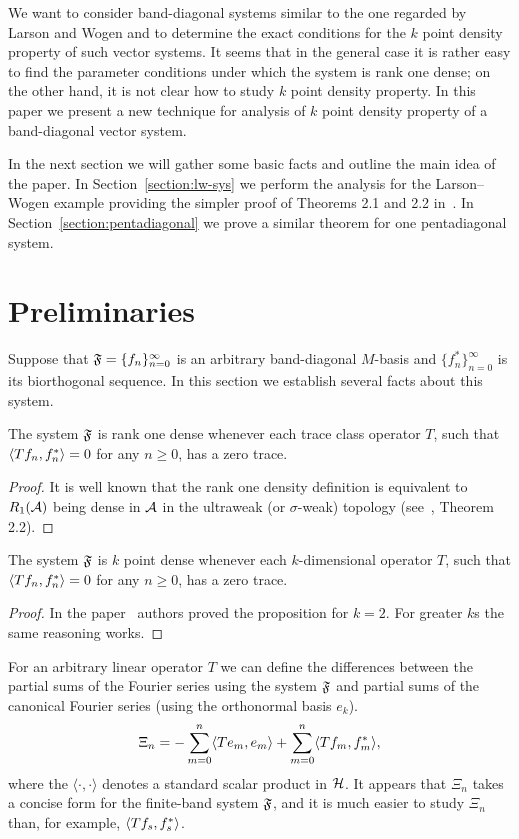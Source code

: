\documentclass[12pt]{amsart}
\theoremstyle{case}
\begin{document}
    We want to consider band-diagonal systems similar to the one regarded by Larson and Wogen and to determine the exact conditions
      for the $k$ point density property of such vector systems.
    It seems that in the general case it is rather easy to find the parameter conditions under which the system is rank one dense;
      on the other hand, it is not clear how to study $k$ point density property.
    In this paper we present a new technique for analysis of $k$ point density property of a band-diagonal vector system.

    In the next section we will gather some basic facts and outline the main idea of the paper.
    In Section~\ref{section:lw-sys} we perform the analysis for the Larson--Wogen example providing the simpler proof of Theorems 2.1 and 2.2 in~\cite{katavolos}.
    In Section~\ref{section:pentadiagonal} we prove a similar theorem for one pentadiagonal system.
\section{Preliminaries}
  \label{sec:preliminaries}
  Suppose that $\fsys=\{f_n\}_{n=0}^\infty$ is an arbitrary band-diagonal $M$-basis and $\{f^*_n\}_{n=0}^\infty$ is its biorthogonal sequence.
  In this section we establish several facts about this system.
  \begin{prop}
    The system $\fsys$ is rank one dense whenever each trace class operator $T$,
      such that $\inner{Tf_n}{f_n^*} = 0$ for any $n \geq 0$, has a zero trace.
  \end{prop}
  \begin{proof}
    It is well known that the rank one density definition is equivalent to $R_1(\cal{A})$ being dense
      in $\cal{A}$ in the ultraweak (or $\sigma$-weak) topology (see~\cite{katavolos}, Theorem 2.2).
  \end{proof}
  \begin{prop}
    The system $\fsys$ is $k$ point dense whenever each $k$-dimensional operator $T$,
      such that $\inner{Tf_n}{f_n^*} = 0$ for any $n \geq 0$, has a zero trace.
  \end{prop}
  \begin{proof}
    In the paper~\cite{katavolos} authors proved the proposition for $k = 2$.
    For greater $k$s the same reasoning works.
  \end{proof}
  For an arbitrary linear operator $T$ we can define the differences between
    the partial sums of the Fourier series using the system $\fsys$ and
    partial sums of the canonical Fourier series (using the orthonormal basis $e_k$).
  \begin{equation}
    \label{eq:xi}
    \Xi_n = -\sum_{m=0}^n \inner{Te_m}{e_m} + \sum_{m=0}^n \inner{Tf_m}{f_m^*},
  \end{equation}
    where the $\langle \cdot, \cdot\rangle$ denotes a standard scalar product in $\cal{H}$.
  It appears that $\Xi_n$ takes a concise form for the finite-band system $\fsys$, and it is much easier to study $\Xi_n$
    than, for example, $\inner{Tf_s}{f_s^*}$.
\end{document}
